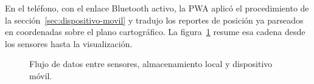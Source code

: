 En el teléfono, con el enlace Bluetooth activo, la PWA aplicó el procedimiento de la sección~\ref{sec:dispositivo-movil} y tradujo los reportes de posición ya parseados en coordenadas sobre el plano cartográfico. La figura~\ref{fig:cap3-integracion-e2e} resume esa cadena desde los sensores hasta la visualización.

\begin{figure}[H]
	\centering
	\caption[Integración extremo a extremo]{Flujo de datos entre sensores, almacenamiento local y dispositivo móvil.}
	\label{fig:cap3-integracion-e2e}
\end{figure}